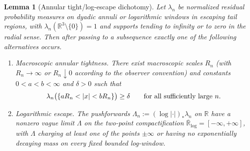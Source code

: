 \documentclass[11pt]{amsart}
\numberwithin{equation}{section}
\theoremstyle{plain}
\newtheorem{lemma}[lemma]{Lemma}
\theoremstyle{definition}
\theoremstyle{remark}
\begin{document}
\begin{lemma}[Annular tight/log-escape dichotomy]
\label{lem:annular-tight-vs-log-escape-dichotomy}
Let \(\lambda_n\) be normalized residual probability measures on dyadic
annuli or logarithmic windows in escaping tail regions, with
\(\lambda_n(\mathbb R^3\setminus\{0\})=1\) and supports tending to infinity
or to zero in the radial sense.  Then after passing to a subsequence exactly
one of the following alternatives occurs.
\begin{enumerate}[label=\textup{(\arabic*)},leftmargin=2.2em]
   \item \emph{Macroscopic annular tightness.}  There exist macroscopic
   scales \(R_n\) (with \(R_n\to\infty\) or \(R_n\downarrow0\) according to
   the observer convention) and constants \(0<a<b<\infty\) and \(\delta>0\)
   such that
   \[
      \lambda_n\bigl(\{aR_n<|x|<bR_n\}\bigr)\ge\delta
      \qquad\hbox{for all sufficiently large }n.
   \]
   \item \emph{Logarithmic escape.}  The pushforwards
   \(\Lambda_n:=(\log|\cdot|)_*\lambda_n\) on \(\mathbb R\) have a nonzero
   vague limit \(\Lambda\) on the two-point compactification
   \(\overline{\mathbb R}_{\log}=[-\infty,+\infty]\), with \(\Lambda\)
   charging at least one of the points \(\pm\infty\) or having no
   exponentially decaying mass on every fixed bounded log-window.
\end{enumerate}
\end{lemma}
\end{document}
